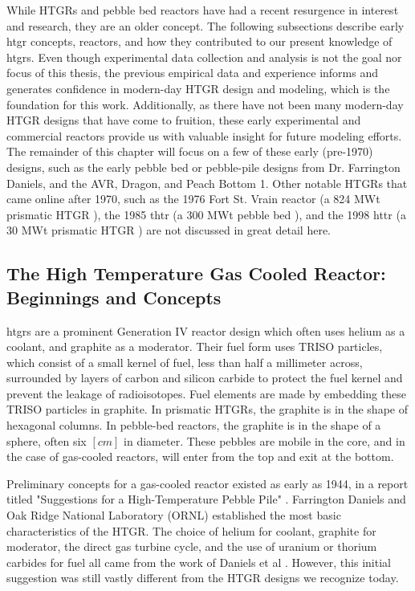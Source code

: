 While HTGRs and pebble bed reactors have had a recent resurgence in interest and research, they are an older concept.  The following subsections describe early \acrshort{htgr} concepts, reactors, and how they contributed to our present knowledge of \acrshort{htgr}s.  Even though experimental data collection and analysis is not the goal nor focus of this thesis, the previous empirical data and experience informs and generates confidence in modern-day HTGR design and modeling, which is the foundation for this work.  Additionally, as there have not been many modern-day HTGR designs that have come to fruition, these early experimental and commercial reactors provide us with valuable insight for future modeling efforts.  The remainder of this chapter will focus on a few of these early (pre-1970) designs, such as the early pebble bed or pebble-pile designs from Dr. Farrington Daniels, and the AVR, Dragon, and Peach Bottom 1.  Other notable HTGRs that came online after 1970, such as the 1976 Fort St. Vrain reactor (a 824 MWt prismatic HTGR \cite{walker_experience_1978}), the 1985 \acrfull{thtr} (a 300 MWt pebble bed \cite{baumer_construction_1990}), and the 1998 \acrfull{httr} (a 30 MWt prismatic HTGR \cite{shiozawa_overview_2004}) are not discussed in great detail here.

\subsection{The High Temperature Gas Cooled Reactor: Beginnings and Concepts}

\acrshort{htgr}s are a prominent Generation IV reactor design which often uses helium as a coolant, and graphite as a moderator.  Their fuel form uses TRISO particles, which consist of a small kernel of fuel, less than half a millimeter across, surrounded by layers of carbon and silicon carbide to protect the fuel kernel and prevent the leakage of radioisotopes.  Fuel elements are made by embedding these TRISO particles in graphite.  In prismatic HTGRs, the graphite is in the shape of hexagonal columns.  In pebble-bed reactors, the graphite is in the shape of a sphere, often six $\left[cm\right]$ in diameter.  These pebbles are mobile in the core, and in the case of gas-cooled reactors, will enter from the top and exit at the bottom.

Preliminary concepts for a gas-cooled reactor existed as early as 1944, in a report titled "Suggestions for a High-Temperature Pebble Pile" \cite{daniels_suggestions_1944}.  Farrington Daniels and Oak Ridge National Laboratory (ORNL) established the most basic characteristics of the HTGR.  The choice of helium for coolant, graphite for moderator, the direct gas turbine cycle, and the use of uranium or thorium carbides for fuel all came from the work of Daniels et al \cite{simnad_early_1991}.  However, this initial suggestion was still vastly different from the HTGR designs we recognize today.

